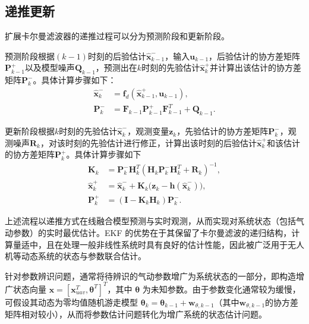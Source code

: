 \subsection{递推更新}
扩展卡尔曼滤波器的递推过程可以分为预测阶段和更新阶段。

预测阶段根据$(k-1)$时刻的后验估计$\hat{\boldsymbol{x}}_{k-1}^-$，输入$\boldsymbol{u}_{k-1}$，后验估计的协方差矩阵$\boldsymbol{P}_{k-1}^{+}$以及模型噪声$\boldsymbol{Q}_{k-1}$，预测出在$k$时刻的先验估计$\hat{\boldsymbol{x}}_{k}^+$并计算出该估计的协方差矩阵$\boldsymbol{P}_{k}^{-}$。具体计算步骤如下：
\begin{equation}
    \begin{aligned}
    \hat{\boldsymbol{x}}_{k}^{-} &= \boldsymbol{f}_d(\hat{\boldsymbol{x}}_{k-1}^{+}, \boldsymbol{u}_{k-1}), \\
    \boldsymbol{P}_{k}^{-} &= \boldsymbol{F}_{k-1} \boldsymbol{P}_{k-1}^{+} \boldsymbol{F}_{k-1}^{T} + \boldsymbol{Q}_{k-1}.
    \end{aligned}
\end{equation}

更新阶段根据$k$时刻的先验估计$\hat{\boldsymbol{x}}_{k}^-$，观测变量$\boldsymbol{z}_k$，先验估计的协方差矩阵$\boldsymbol{P}_{k}^{-}$，观测噪声$\boldsymbol{R}_k$，对该时刻的先验估计进行修正，计算出该时刻的后验估计$\hat{\boldsymbol{x}}_{k}^+$和该估计的协方差矩阵$\boldsymbol{P}_{k}^{+}$。具体计算步骤如下
\begin{equation}
    \begin{aligned}
        \boldsymbol{K}_{k} &= \boldsymbol{P}_{k}^{-} \boldsymbol{H}_{k}^{T} (\boldsymbol{H}_{k} \boldsymbol{P}_{k}^{-} \boldsymbol{H}_{k}^{T} + \boldsymbol{R}_{k})^{-1}, \\
        \hat{\boldsymbol{x}}_{k}^{+} &= \hat{\boldsymbol{x}}_{k}^{-} + \boldsymbol{K}_{k} \big( \boldsymbol{z}_{k} - \boldsymbol{h}(\hat{\boldsymbol{x}}_{k}^{-}) \big), \\
        \boldsymbol{P}_{k}^{+} &= (\boldsymbol{I} - \boldsymbol{K}_{k} \boldsymbol{H}_{k}) \boldsymbol{P}_{k}^{-}.
    \end{aligned}
\end{equation}

上述流程以递推方式在线融合模型预测与实时观测，从而实现对系统状态（包括气动参数）的实时最优估计。EKF 的优势在于其保留了卡尔曼滤波的递归结构，计算量适中，且在处理一般非线性系统时具有良好的估计性能，因此被广泛用于无人机等动态系统的状态与参数联合估计。

针对参数辨识问题，通常将待辨识的气动参数增广为系统状态的一部分，即构造增广状态向量 $\boldsymbol{x} = [\boldsymbol{x}_{uav}^{T}, \boldsymbol{\theta}^T]^{T}$，其中 $\boldsymbol{\theta}$ 为未知参数。由于参数变化通常较为缓慢，可假设其动态为零均值随机游走模型 $\boldsymbol{\theta}_{k} = \boldsymbol{\theta}_{k-1} + \boldsymbol{w}_{\theta,k-1}$（其中$\boldsymbol{w}_{\theta,k-1}$的协方差矩阵相对较小），从而将参数估计问题转化为增广系统的状态估计问题。

